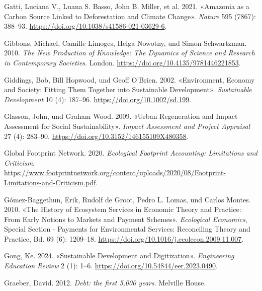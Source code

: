 \documentclass[
  nswissgerman,
  a4paper,
  DIV=11,
  numbers=noendperiod,
  oneside,
  openany]{scrreprt}
\newlength{\cslhangindent}
\newenvironment{CSLReferences}[2] %
 {\begin{list}{}{%
  \setlength{\itemindent}{0pt}
  \setlength{\leftmargin}{0pt}
  \setlength{\parsep}{0pt}
  \ifodd #1
   \setlength{\leftmargin}{\cslhangindent}
   \setlength{\itemindent}{-1\cslhangindent}
  \fi
  \setlength{\itemsep}{#2\baselineskip}}}
 {\end{list}}
\begin{document}
\begin{CSLReferences}{1}{1}
Gatti, Luciana V., Luana S. Basso, John B. Miller, et al. 2021.
{«Amazonia as a Carbon Source Linked to Deforestation and Climate
Change»}. \emph{Nature} 595 (7867): 388--93.
\url{https://doi.org/10.1038/s41586-021-03629-6}.

Gibbons, Michael, Camille Limoges, Helga Nowotny, und Simon Schwartzman.
2010. \emph{The {New} {Production} of {Knowledge}: {The} {Dynamics} of
{Science} and {Research} in {Contemporary} {Societies}}. London.
\url{https://doi.org/10.4135/9781446221853}.

Giddings, Bob, Bill Hopwood, und Geoff O'Brien. 2002. {«Environment,
Economy and Society: Fitting Them Together into Sustainable
Development»}. \emph{Sustainable Development} 10 (4): 187--96.
\url{https://doi.org/10.1002/sd.199}.

Glasson, John, und Graham Wood. 2009. {«Urban Regeneration and Impact
Assessment for Social Sustainability»}. \emph{Impact Assessment and
Project Appraisal} 27 (4): 283--90.
\url{https://doi.org/10.3152/146155109X480358}.

Global Footprint Network. 2020. \emph{Ecological {Footprint}
{Accounting}: {Limitations} and {Criticism}}.
\url{https://www.footprintnetwork.org/content/uploads/2020/08/Footprint-Limitations-and-Criticism.pdf}.

{Gómez-Baggethun, Erik, Rudolf de Groot, Pedro L. Lomas, und Carlos
Montes}. 2010. {«The History of Ecosystem Services in Economic Theory
and Practice: {From} Early Notions to Markets and Payment Schemes»}.
\emph{Ecological Economics}, Special {Section} - {Payments} for
{Environmental Services}: {Reconciling Theory} and {Practice}, Bd. 69
(6): 1209--18. \url{https://doi.org/10.1016/j.ecolecon.2009.11.007}.

Gong, Ke. 2024. {«Sustainable Development and Digitization»}.
\emph{Engineering Education Review} 2 (1): 1--6.
\url{https://doi.org/10.54844/eer.2023.0490}.

Graeber, David. 2012. \emph{Debt: the first 5,000 years}. Melville
House.


\end{CSLReferences}
\end{document}
